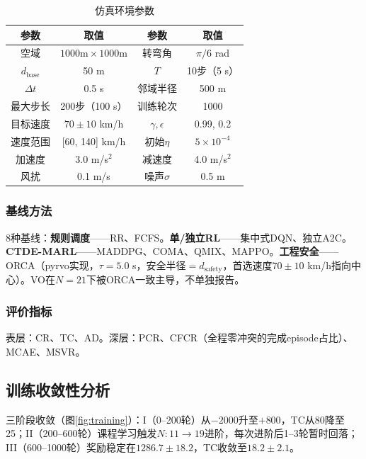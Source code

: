 \documentclass[12pt,a4paper,UTF8]{ctexart}
\begin{document}
\begin{table}[H]
    \centering\small
    \caption{仿真环境参数}
    \label{tab:env}
    \begin{tabular}{|c|c|c|c|}
        \hline
        \textbf{参数} & \textbf{取值} & \textbf{参数} & \textbf{取值} \\
        \hline
        空域 & $1000\text{m}\times1000\text{m}$ & 转弯角 & $\pi/6$ rad \\
        $d_{\text{base}}$ & 50 m & $T$ & 10步（5 s） \\
        $\Delta t$ & 0.5 s & 邻域半径 & 500 m \\
        最大步长 & 200步（100 s） & 训练轮次 & 1000 \\
        目标速度 & $70\pm10$ km/h & $\gamma,\epsilon$ & 0.99, 0.2 \\
        速度范围 & [60, 140] km/h & 初始$\eta$ & $5\times10^{-4}$ \\
        加速度 & 3.0 m/s$^2$ & 减速度 & 4.0 m/s$^2$ \\
        风扰 & 0.1 m/s & 噪声$\sigma$ & 0.5 m \\
        \hline
    \end{tabular}
\end{table}

\subsubsection{基线方法}

8种基线：\textbf{规则调度}——RR、FCFS。\textbf{单/独立RL}——集中式DQN、独立A2C。\textbf{CTDE-MARL}——MADDPG、COMA、QMIX、MAPPO。\textbf{工程安全}——ORCA\cite{ref4}（pyrvo实现，$\tau=5.0$ s，安全半径$=d_{\text{safety}}$，首选速度$70\pm10$ km/h指向中心）。VO在$N=21$下被ORCA一致主导，不单独报告。

\subsubsection{评价指标}

表层：CR、TC、AD。深层：PCR、CFCR（全程零冲突的完成episode占比）、MCAE、MSVR。

\subsection{训练收敛性分析}

三阶段收敛（图\ref{fig:training}）：I（0--200轮）从$-2000$升至$+800$，TC从80降至25；II（200--600轮）课程学习触发$N:11\to19$进阶，每次进阶后1--3轮暂时回落；III（600--1000轮）奖励稳定在$1286.7\pm18.2$，TC收敛至$18.2\pm2.1$。
\end{document}
